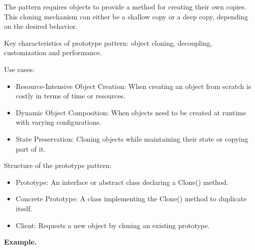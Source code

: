 The pattern requires objects to provide a method for creating their own copies. This cloning mechanism can either be a shallow copy or a deep copy, depending on the desired behavior.

Key characteristics of prototype pattern: object cloning, decoupling, customization and performance.

Use cases:

\begin{itemize}
\item Resource-Intensive Object Creation: When creating an object from scratch is costly in terms of time or resources.

\item Dynamic Object Composition: When objects need to be created at runtime with varying configurations.

\item State Preservation: Cloning objects while maintaining their state or copying part of it.
\end{itemize}

Structure of the prototype pattern:

\begin{itemize}
\item Prototype: An interface or abstract class declaring a Clone() method.

\item Concrete Prototype: A class implementing the Clone() method to duplicate itself.

\item Client: Requests a new object by cloning an existing prototype.
\end{itemize}

\textbf{Example.}

